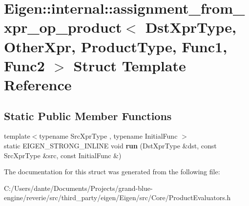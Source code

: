 \hypertarget{struct_eigen_1_1internal_1_1assignment__from__xpr__op__product}{}\section{Eigen\+::internal\+::assignment\+\_\+from\+\_\+xpr\+\_\+op\+\_\+product$<$ Dst\+Xpr\+Type, Other\+Xpr, Product\+Type, Func1, Func2 $>$ Struct Template Reference}
\label{struct_eigen_1_1internal_1_1assignment__from__xpr__op__product}
\subsection*{Static Public Member Functions}
\begin{DoxyCompactItemize}
\item 
\mbox{\label{struct_eigen_1_1internal_1_1assignment__from__xpr__op__product_a7409e659f7fd561b060a4a262ba3672a}} 
{\footnotesize template$<$typename Src\+Xpr\+Type , typename Initial\+Func $>$ }\\static E\+I\+G\+E\+N\+\_\+\+S\+T\+R\+O\+N\+G\+\_\+\+I\+N\+L\+I\+NE void {\bfseries run} (Dst\+Xpr\+Type \&dst, const Src\+Xpr\+Type \&src, const Initial\+Func \&)
\end{DoxyCompactItemize}


The documentation for this struct was generated from the following file\+:\begin{DoxyCompactItemize}
\item 
C\+:/\+Users/dante/\+Documents/\+Projects/grand-\/blue-\/engine/reverie/src/third\+\_\+party/eigen/\+Eigen/src/\+Core/Product\+Evaluators.\+h\end{DoxyCompactItemize}
